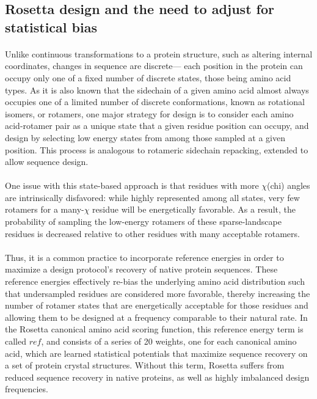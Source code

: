 \subsection{Rosetta design and the need to adjust for statistical bias}
\paragraph{}
Unlike continuous transformations to a protein structure, such as altering internal coordinates, changes in sequence are discrete--- each position in the protein can occupy only one of a fixed number of discrete states, those being amino acid types.
As it is also known that the sidechain of a given amino acid almost always occupies one of a limited number of discrete conformations, known as rotational isomers, or rotamers, one major strategy for design is to consider each amino acid-rotamer pair as a unique state that a given residue position can occupy, and design by selecting low energy states from among those sampled at a given position\cite{leaver-fay_chapter_2011}.
This process is analogous to rotameric sidechain repacking, extended to allow sequence design.

\paragraph{}
One issue with this state-based approach is that residues with more $\chi$(chi) angles are intrinsically disfavored: while highly represented among all states, very few rotamers for a many-$\chi$ residue will be energetically favorable.
As a result, the probability of sampling the low-energy rotamers of these sparse-landscape residues is decreased relative to other residues with many acceptable rotamers\cite{leaver-fay_chapter_2013,rohl_protein_2004}.

\paragraph{}
Thus, it is a common practice to incorporate reference energies in order to maximize a design protocol's recovery of native protein sequences.
These reference energies effectively re-bias the underlying amino acid distribution such that undersampled residues are considered more favorable, thereby increasing the number of rotamer states that are energetically acceptable for those residues and allowing them to be designed at a frequency comparable to their natural rate. 
In the Rosetta canonical amino acid scoring function, this reference energy term is called $ref$, and consists of a series of 20 weights, one for each canonical amino acid, which are learned statistical potentials that maximize sequence recovery on a set of protein crystal structures. Without this term, Rosetta suffers from reduced sequence recovery in native proteins, as well as highly imbalanced design frequencies\cite{rohl_protein_2004}.

